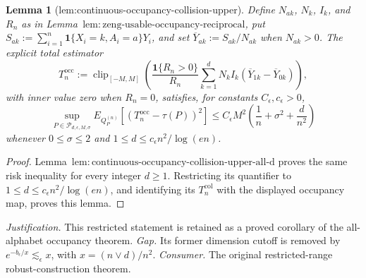 \documentclass{article}
\newtheorem{lemma}{Lemma}
\begin{document}
\begin{lemma}[lem:continuous-occupancy-collision-upper]\label{lem:continuous-occupancy-collision-upper}
Define \(N_{ak}\), \(N_k\), \(I_k\), and \(R_n\) as in Lemma~\(\mathrm{lem:zeng\text{-}usable\text{-}occupancy\text{-}reciprocal}\), put \(S_{ak}:=\sum_{i=1}^n\mathbf 1\{X_i=k,A_i=a\}Y_i\), and set \(\overline Y_{ak}:=S_{ak}/N_{ak}\) when \(N_{ak}>0\).  The explicit total estimator
\[
 T_n^{\mathrm{occ}}:=\operatorname{clip}_{[-M,M]}\!\left(
 \frac{\mathbf 1\{R_n>0\}}{R_n}
 \sum_{k=1}^dN_kI_k(\overline Y_{1k}-\overline Y_{0k})
 \right),
\]
with inner value zero when \(R_n=0\), satisfies, for constants \(C_{\epsilon},c_{\epsilon}>0\),
\[
 \sup_{P\in\mathcal P_{d,\epsilon,M,\sigma}}
 E_{Q_P^{(n)}}[(T_n^{\mathrm{occ}}-\tau(P))^2]
 \le C_{\epsilon}M^2\left(\frac1n+\sigma^2+\frac d{n^2}\right)
\]
whenever \(0\le\sigma\le2\) and \(1\le d\le c_{\epsilon}n^2/\log(en)\).
\end{lemma}
\begin{proof}
Lemma~\(\mathrm{lem:continuous\text{-}occupancy\text{-}collision\text{-}upper\text{-}all\text{-}d}\) proves the same risk inequality for every integer \(d\ge1\).  Restricting its quantifier to \(1\le d\le c_{\epsilon}n^2/\log(en)\), and identifying its \(T_n^{\mathrm{col}}\) with the displayed occupancy map, proves this lemma.
\end{proof}
\par\smallskip\noindent \textit{Justification.} This restricted statement is retained as a proved corollary of the all-alphabet occupancy theorem. \textit{Gap.} Its former dimension cutoff is removed by \(e^{-b_{\epsilon}/x}\lesssim_{\epsilon}x\), with \(x=(n\vee d)/n^2\). \textit{Consumer.} The original restricted-range robust-construction theorem.
\end{document}
